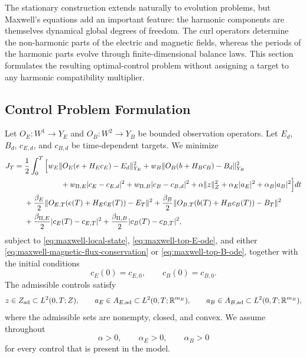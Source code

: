 \documentclass{article}
\newcommand{\R} {\mathbb R}
\newcommand{\norm}[1]{\lVert #1\rVert}
\begin{document}
The stationary construction extends naturally to evolution problems, but Maxwell's equations add an important feature: the harmonic components are themselves dynamical global degrees of freedom.  The curl operators determine the non-harmonic parts of the electric and magnetic fields, whereas the periods of the harmonic parts evolve through finite-dimensional balance laws.  This section formulates the resulting optimal-control problem without assigning a target to any harmonic compatibility multiplier.


\subsection{Control Problem Formulation}
\label{sec:maxwell-ocp}

Let $O_E:W^1\to Y_E$ and $O_B:W^2\to Y_B$ be bounded observation operators.  Let $E_d$, $B_d$, $c_{E,d}$, and $c_{B,d}$ be time-dependent targets.  We minimize
\begin{equation}
\begin{aligned}
  J_T={}&\frac12\int_0^T
  \Big[
    w_E\norm{O_E(e+H_Ec_E)-E_d}_{Y_E}^2
   +w_B\norm{O_B(b+H_Bc_B)-B_d}_{Y_B}^2\\
  &\hspace{17mm}
   +w_{\Pi,E}|c_E-c_{E,d}|^2
   +w_{\Pi,B}|c_B-c_{B,d}|^2
   +\alpha\norm{z}_Z^2
   +\alpha_E|a_E|^2
   +\alpha_B|a_B|^2
  \Big]dt\\
  &+\frac{\beta_E}{2}\norm{O_{E,T}(e(T)+H_Ec_E(T))-E_T}^2
   +\frac{\beta_B}{2}\norm{O_{B,T}(b(T)+H_Bc_B(T))-B_T}^2\\
  &+\frac{\beta_{\Pi,E}}{2}|c_E(T)-c_{E,T}|^2
   +\frac{\beta_{\Pi,B}}{2}|c_B(T)-c_{B,T}|^2,
  \label{eq:maxwell-objective}
\end{aligned}
\end{equation}
subject to \eqref{eq:maxwell-local-state}, \eqref{eq:maxwell-top-E-ode}, and either \eqref{eq:maxwell-magnetic-flux-conservation} or \eqref{eq:maxwell-top-B-ode}, together with the initial conditions
\begin{equation}
  c_E(0)=c_{E,0},\qquad c_B(0)=c_{B,0}.
\end{equation}
The admissible controls satisfy
\[
  z\in Z_{\rm ad}\subset L^2(0,T;Z),\qquad
  a_E\in A_{E,{\rm ad}}\subset L^2(0,T;\R^{m_E}),\qquad
  a_B\in A_{B,{\rm ad}}\subset L^2(0,T;\R^{m_B}),
\]
where the admissible sets are nonempty, closed, and convex.  We assume throughout
\begin{equation}
  \alpha>0,\qquad \alpha_E>0,\qquad \alpha_B>0
  \label{eq:maxwell-positive-reg}
\end{equation}
for every control that is present in the model.
\end{document}
